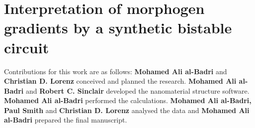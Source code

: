 \chapter{Interpretation of morphogen gradients by a synthetic bistable circuit}
\label{chapter:double-exclusive}
\vspace{-9mm}
Contributions for this work are as follows: \textbf{Mohamed Ali al-Badri} and \textbf{Christian D. Lorenz} conceived and planned the research. \textbf{Mohamed Ali al-Badri} and \textbf{Robert C. Sinclair} developed the nanomaterial structure software. \textbf{Mohamed Ali al-Badri} performed the calculations. \textbf{Mohamed Ali al-Badri, Paul Smith} and \textbf{Christian D. Lorenz} analysed the data and \textbf{Mohamed Ali al-Badri} prepared the final manuscript.

